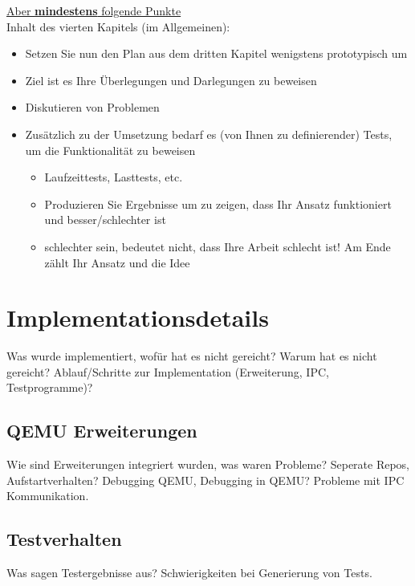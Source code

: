 \underline{Aber \textbf{mindestens} folgende Punkte}\\
Inhalt des vierten Kapitels (im Allgemeinen):
\begin{itemize}
    \item Setzen Sie nun den Plan aus dem dritten Kapitel wenigstens prototypisch um
    \item Ziel ist es Ihre Überlegungen und Darlegungen zu beweisen
    \item Diskutieren von Problemen
    \item Zusätzlich zu der Umsetzung bedarf es (von Ihnen zu definierender) Tests, um die Funktionalität zu beweisen
    \begin{itemize}
        \item Laufzeittests, Lasttests, etc.
        \item Produzieren Sie Ergebnisse um zu zeigen, dass Ihr Ansatz funktioniert und besser/schlechter ist
        \item \glqq schlechter\grqq{} sein, bedeutet nicht, dass Ihre Arbeit schlecht ist! Am Ende zählt Ihr Ansatz und die Idee
    \end{itemize}
\end{itemize}

\section{Implementationsdetails}
Was wurde implementiert, wofür hat es nicht gereicht?
Warum hat es nicht gereicht?
Ablauf/Schritte zur Implementation (Erweiterung, IPC, Testprogramme)?

\subsection{QEMU Erweiterungen}
Wie sind Erweiterungen integriert wurden, was waren Probleme?
Seperate Repos, Aufstartverhalten?
Debugging QEMU, Debugging in QEMU?
Probleme mit IPC Kommunikation.

\subsection{Testverhalten}
Was sagen Testergebnisse aus?
Schwierigkeiten bei Generierung von Tests.
